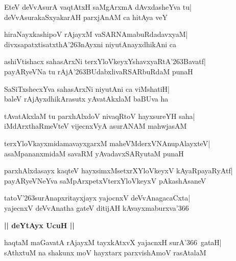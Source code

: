 \documentclass[twoside,12pt,openright]{book}
\def\S{\char'263}
\newcounter{shloka}[chapter]
\def\uvaca#1{\centerline{{\large\textbf{#1}}}}
\begin{document}
\begin{shloka}%
EteV deVvAsurA vaqtAtxH saMgArxmA dAvxdasheYva tu|\\
deVvAsurakaSxyakarAH parxjAnAM ca hitAya veY
\end{shloka}

\begin{shloka}%
hiraNayxkashipoV rAjayxM vaSARNAmabuRdadavxyaM|\\
divxsapatxtisatxthA\S nAyxni niyutAnayxdhikAni ca
\end{shloka}

\begin{shloka}%
ashiVtishacx sahasArxNi terxYloVkeyxYshavxyaRtA\S Bavatf|\\
payARyeVNa tu rAjA\S BUdabxlivaRSARbuRdaM punaH
\end{shloka}

\begin{shloka}%
SaSiTxshecxYva sahasArxNi niyutAni ca viMshatiH|\\
baleV rAjAyxdhikArasutx yAvatAkxlaM baBUva ha
\end{shloka}

\begin{shloka}%
tAvatAkxlaM tu parxhAlxdoV nivaqRtoV hayxsureYH saha|\\
iMdArxthaRmeVteV vijecnxVyA asurANAM mahwjasAM
\end{shloka}

\begin{shloka}%
terxYloVkayxmidamavayxgarxM maheVMderxVNAnupAlayxteV|\\
asaMpananxmidaM savaRM yAvadavxSARyutaM punaH
\end{shloka}

\begin{shloka}%
parxhAlxdasayx kaqteV hayxsimxMsetxrXYloVkeyxV kAyaRpayaRyAtf|\\
payARyeVNeYva saMpArxpetxVterxYloVkeyxV pAkashAsaneV
\end{shloka}

\begin{shloka}%
tatoV\S surAnapxritayxjayx yajocnxV deVvAnagacaCxta|\\
yajecnxV deVvAnatha gateV ditijAH kAvayxmaburxva\char'366
\end{shloka}

\uvaca{|| deYtAyx UcuH ||}
\begin{shloka}%
haqtaM maGavatA rAjayxM tayxkAtxvX yajacnxH surA\char'366\ gataH|\\
sAthxtuM na shakunx moV hayxtarx parxvishAmoV rasAtalaM 
\end{shloka}
\end{document}
